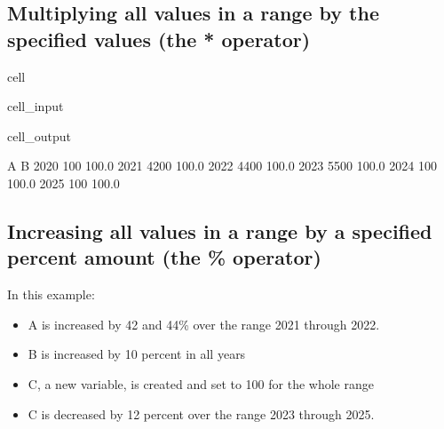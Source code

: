 \documentclass[letterpaper,10pt,english]{jupyterBook}
\begin{document}
\subsection{Multiplying all values in a range by the specified values (the * operator)}
\label{\detokenize{content/howto/update/model update:multiplying-all-values-in-a-range-by-the-specified-values-the-operator}}
\begin{sphinxuseclass}{cell}\begin{sphinxVerbatimInput}

\begin{sphinxuseclass}{cell_input}
\begin{sphinxVerbatim}[commandchars=\\\{\}]
\end{sphinxVerbatim}

\end{sphinxuseclass}\end{sphinxVerbatimInput}
\begin{sphinxVerbatimOutput}

\begin{sphinxuseclass}{cell_output}
\begin{sphinxVerbatim}[commandchars=\\\{\}]
         A      B
2020   100  100.0
2021  4200  100.0
2022  4400  100.0
2023  5500  100.0
2024   100  100.0
2025   100  100.0
\end{sphinxVerbatim}

\end{sphinxuseclass}\end{sphinxVerbatimOutput}

\end{sphinxuseclass}

\subsection{Increasing all  values in a range by a  specified percent amount (the \% operator)}
\label{\detokenize{content/howto/update/model update:increasing-all-values-in-a-range-by-a-specified-percent-amount-the-operator}}
\sphinxAtStartPar
In this example:
\begin{itemize}
\item {} 
\sphinxAtStartPar
A is increased by 42 and 44\% over the range 2021 through 2022.

\item {} 
\sphinxAtStartPar
B is increased by 10 percent in all years

\item {} 
\sphinxAtStartPar
C, a new variable, is created and set to 100 for the whole range

\item {} 
\sphinxAtStartPar
C is decreased by 12 percent over the range 2023 through 2025.

\end{itemize}
\end{document}
